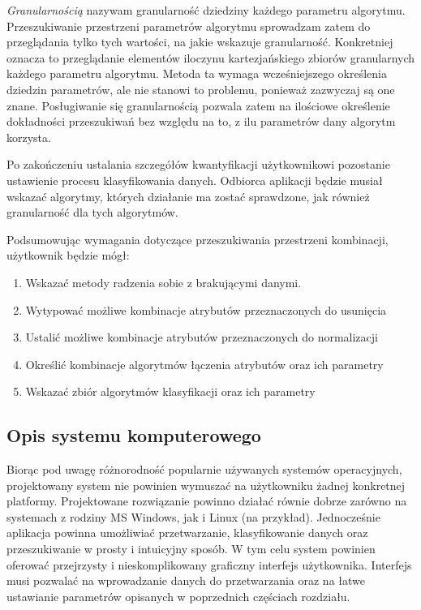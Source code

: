 \documentclass[../thesis.tex]{subfiles}
\begin{document}
\textit{Granularnością} nazywam granularność dziedziny każdego parametru algorytmu. Przeszukiwanie przestrzeni parametrów algorytmu sprowadzam zatem do przeglądania tylko tych wartości, na jakie wskazuje granularność. Konkretniej oznacza to przeglądanie elementów iloczynu kartezjańskiego zbiorów granularnych każdego parametru algorytmu. Metoda ta wymaga wcześniejszego określenia dziedzin parametrów, ale nie stanowi to problemu, ponieważ zazwyczaj są one znane. Posługiwanie się granularnością pozwala zatem na ilościowe określenie dokładności przeszukiwań bez względu na to, z ilu parametrów dany algorytm korzysta. 

Po zakończeniu ustalania szczegółów kwantyfikacji użytkownikowi pozostanie ustawienie procesu klasyfikowania danych. Odbiorca aplikacji będzie musiał wskazać algorytmy, których działanie ma zostać sprawdzone, jak również granularność dla tych algorytmów.

Podsumowując wymagania dotyczące przeszukiwania przestrzeni kombinacji, użytkownik będzie mógł:
\begin{enumerate}
\item Wskazać metody radzenia sobie z brakującymi danymi.
\item Wytypować możliwe kombinacje atrybutów przeznaczonych do usunięcia
\item Ustalić możliwe kombinacje atrybutów przeznaczonych do normalizacji
\item Określić kombinacje algorytmów łączenia atrybutów oraz ich parametry
\item Wskazać zbiór algorytmów klasyfikacji oraz ich parametry
\end{enumerate}

\subsection{Opis systemu komputerowego}

Biorąc pod uwagę różnorodność popularnie używanych systemów operacyjnych, projektowany system nie powinien wymuszać na użytkowniku żadnej konkretnej platformy. Projektowane rozwiązanie powinno działać równie dobrze zarówno na systemach z rodziny MS Windows, jak i Linux (na przykład). Jednocześnie aplikacja powinna umożliwiać przetwarzanie, klasyfikowanie danych oraz przeszukiwanie w prosty i intuicyjny sposób. W tym celu system powinien oferować przejrzysty i nieskomplikowany graficzny interfejs użytkownika. Interfejs musi pozwalać na wprowadzanie danych do przetwarzania oraz na łatwe ustawianie parametrów opisanych w poprzednich częściach rozdziału.
\end{document}
